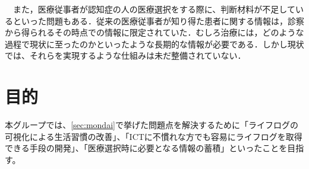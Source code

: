 \documentclass[../report]{subfiles}
\begin{document}
　また，医療従事者が認知症の人の医療選択をする際に、判断材料が不足しているといった問題もある．従来の医療従事者が知り得た患者に関する情報は，診察から得られるその時点での情報に限定されていた．むしろ治療には，どのような過程で現状に至ったのかといったような長期的な情報が必要である．しかし現状では、それらを実現するような仕組みは未だ整備されていない．

\section{目的}
本グループでは、\ref{sec:mondai}で挙げた問題点を解決するために「ライフログの可視化による生活習慣の改善」、「ICTに不慣れな方でも容易にライフログを取得できる手段の開発」、「医療選択時に必要となる情報の蓄積」といったことを目指す。
\end{document}
